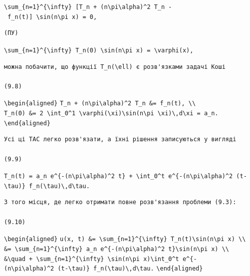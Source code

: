 \documentclass[
  ukrainian,
]{article}
\begin{document}
\texttt{\textbackslash{}sum\_\{n=1\}\^{}\{\textbackslash{}infty\}\ {[}T\textquotesingle{}\_n\ +\ (n\textbackslash{}pi\textbackslash{}alpha)\^{}2\ T\_n\ -\ f\_n(t){]}\ \textbackslash{}sin(n\textbackslash{}pi\ x)\ =\ 0,}

\begin{verbatim}
(ПУ)
\end{verbatim}

\texttt{\textbackslash{}sum\_\{n=1\}\^{}\{\textbackslash{}infty\}\ T\_n(0)\ \textbackslash{}sin(n\textbackslash{}pi\ x)\ =\ \textbackslash{}varphi(x),}

\begin{verbatim}
можна побачити, що функції T_n(\ell) є розв'язками задачі Коші

(9.8)
\end{verbatim}

\texttt{\textbackslash{}begin\{aligned\}}
\texttt{T\_n\textquotesingle{}\ +\ (n\textbackslash{}pi\textbackslash{}alpha)\^{}2\ T\_n\ \&=\ f\_n(t),\ \textbackslash{}\textbackslash{}}
\texttt{T\_n(0)\ \&=\ 2\ \textbackslash{}int\_0\^{}1\ \textbackslash{}varphi(\textbackslash{}xi)\textbackslash{}sin(n\textbackslash{}pi\ \textbackslash{}xi)\textbackslash{},d\textbackslash{}xi\ =\ a\_n.}
\texttt{\textbackslash{}end\{aligned\}}

\begin{verbatim}
Усі ці TAC легко розв'язати, а їхні рішення записуються у вигляді

(9.9)
\end{verbatim}

\texttt{T\_n(t)\ =\ a\_n\ e\^{}\{-(n\textbackslash{}pi\textbackslash{}alpha)\^{}2\ t\}\ +\ \textbackslash{}int\_0\^{}t\ e\^{}\{-(n\textbackslash{}pi\textbackslash{}alpha)\^{}2\ (t-\textbackslash{}tau)\}\ f\_n(\textbackslash{}tau)\textbackslash{},d\textbackslash{}tau.}

\begin{verbatim}
З того місця, де легко отримати повне розв'язання проблеми (9.3):

(9.10)
\end{verbatim}

\texttt{\textbackslash{}begin\{aligned\}}
\texttt{u(x,\ t)\ \&=\ \textbackslash{}sum\_\{n=1\}\^{}\{\textbackslash{}infty\}\ T\_n(t)\textbackslash{}sin(n\textbackslash{}pi\ x)\ \textbackslash{}\textbackslash{}}
\texttt{\&=\ \textbackslash{}sum\_\{n=1\}\^{}\{\textbackslash{}infty\}\ a\_n\ e\^{}\{-(n\textbackslash{}pi\textbackslash{}alpha)\^{}2\ t\}\textbackslash{}sin(n\textbackslash{}pi\ x)\ \textbackslash{}\textbackslash{}}
\texttt{\&\textbackslash{}quad\ +\ \textbackslash{}sum\_\{n=1\}\^{}\{\textbackslash{}infty\}\ \textbackslash{}sin(n\textbackslash{}pi\ x)\textbackslash{}int\_0\^{}t\ e\^{}\{-(n\textbackslash{}pi\textbackslash{}alpha)\^{}2\ (t-\textbackslash{}tau)\}\ f\_n(\textbackslash{}tau)\textbackslash{},d\textbackslash{}tau.}
\texttt{\textbackslash{}end\{aligned\}}
\end{document}
